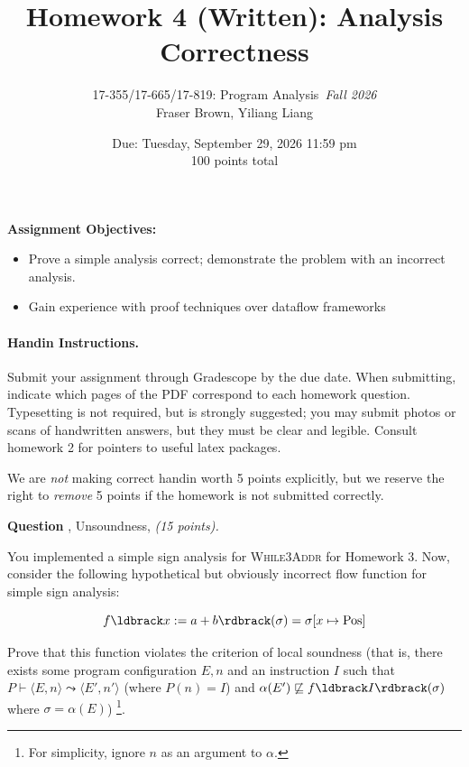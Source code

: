 \documentclass[11pt]{article}
\title{Homework 4 (Written): Analysis Correctness}
\author{17-355/17-665/17-819: Program Analysis\ \emph {Fall 2026}\\
        Fraser Brown, Yiliang Liang }
\date{Due: Tuesday, September 29, 2026 11:59 pm \\[1em]
100 points total
}
\newcommand{\parg}[1] %
  {\ldbrack #1 \rdbrack}
\newcounter{qnum}
\newcommand{\question}[2]
  {\bigskip \noindent
  {\bf Question \arabic{qnum}}, {#1}, {\it(#2 points).}
  \addtocounter{qnum}{1}
  }
\begin{document}
\newcommand{\pfalse}{\mbox{false}}
\newcommand{\ptrue}{\mbox{true}}
\newcommand{\pand}{\mbox{and}}
\newcommand{\por}{\mbox{or}}
\newcommand{\pskip}{\mbox{skip}}
\newcommand{\pif}{\mbox{if}}
\newcommand{\pthen}{\mbox{then}}
\newcommand{\pelse}{\mbox{else}}
\newcommand{\pdo}{\mbox{do}}
\newcommand{\pwhile}{\mbox{while}}
\def\While{\textsc{While}}
\def\WhileThAddr{\textsc{While3Addr}}


\maketitle

\noindent\textbf{Assignment Objectives:}
\begin{itemize}[labelwidth=0.7em, labelsep=0.6em, topsep=0ex, itemsep=0ex,
  parsep=0ex]
\item  Prove a simple analysis correct; demonstrate the problem with an incorrect analysis.
\item Gain experience with proof techniques over dataflow frameworks
\end{itemize}

\paragraph{Handin Instructions.} Submit your assignment through Gradescope by the due
date. When submitting, indicate which pages of the PDF correspond to each
homework question. 
Typesetting is not required, but is strongly suggested; you may submit photos or
scans of handwritten answers, but they must be clear and legible.  Consult homework 2
for pointers to useful latex packages.  

We are \emph{not} making correct handin
worth 5 points explicitly, but we reserve the right to \emph{remove} 5 points if the homework
is not submitted correctly. 

\question{Unsoundness}{15}  You implemented a simple sign analysis for
\WhileThAddr \text{ } for Homework 3. Now, consider the following hypothetical 
but obviously incorrect flow function for simple sign analysis:

\[
f\parg{x := a + b}(\sigma) = \sigma[x \mapsto \mathrm{Pos}]
\]

Prove that this function violates the criterion of local soundness (that is,
there exists some 
program configuration $E,n$ and an instruction $I$ such that
$P \vdash \langle E,n \rangle \leadsto \langle E',n' \rangle$ (where $P(n)=I$) and
$\alpha(E') \not\sqsubseteq f\parg{I}(\sigma)$ where $\sigma = \alpha(E)$)
\footnote{For simplicity, ignore  $n$ as an argument to $\alpha$.}.
\end{document}
